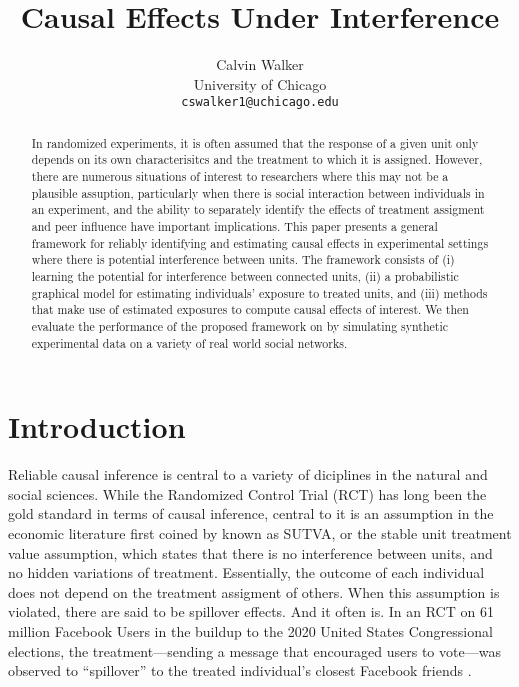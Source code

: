 \documentclass{article}
\title{Causal Effects Under Interference}
\author{%
  Calvin Walker \\
  University of Chicago\\
  \texttt{cswalker1@uchicago.edu} \\
}
\begin{document}
\maketitle


\begin{abstract}
    In randomized experiments, it is often assumed that the response of a given unit only depends on its own characterisitcs and the treatment to which it is assigned. However, there are numerous situations of interest to researchers 
    where this may not be a plausible assuption, particularly when there is social interaction between individuals in an experiment, and the ability to separately identify the effects of treatment assigment and peer influence have important implications. 
    This paper presents a general framework for reliably identifying and estimating causal effects in experimental settings where there is potential interference between units. The framework consists of 
    (i) learning the potential for interference between connected units, (ii) a probabilistic graphical model for estimating individuals' exposure to treated units, and (iii) methods that make use of estimated exposures to compute causal effects of interest. We then evaluate the performance of the proposed framework on by simulating synthetic experimental data on a variety of real world social networks.
\end{abstract}


\section{Introduction}

Reliable causal inference is central to a variety of diciplines in the natural and social sciences. While the Randomized Control Trial (RCT) has long been the gold standard in terms of 
causal inference, central to it is an assumption in the economic literature first coined by \cite{Rubin} known as SUTVA, or the stable unit treatment value assumption, which states that there is no
interference between units, and no hidden variations of treatment. Essentially, the outcome of each individual does not depend on the treatment assigment of others. When this assumption is violated, 
there are said to be spillover effects. And it often is. In an RCT on 61 million Facebook Users in the buildup to the 2020 United States Congressional elections, the treatment—sending a message that encouraged users to vote—was 
observed to ``spillover'' to the treated individual's closest Facebook friends \cite{Bond}. 
\end{document}

